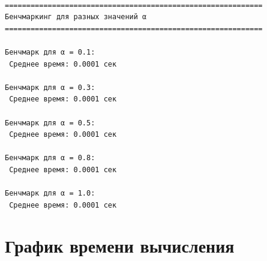 \documentclass[
  russian,
  12pt,
  a4paper,
  DIV=11,
  numbers=noendperiod]{scrreprt}
\newenvironment{Shaded}{\begin{snugshade}}{\end{snugshade}}
\newcommand{\ControlFlowTok}[1]{\textcolor[rgb]{0.00,0.23,0.31}{\textbf{#1}}}
\newcommand{\FloatTok}[1]{\textcolor[rgb]{0.68,0.00,0.00}{#1}}
\newcommand{\FunctionTok}[1]{\textcolor[rgb]{0.28,0.35,0.67}{#1}}
\newcommand{\KeywordTok}[1]{\textcolor[rgb]{0.00,0.23,0.31}{\textbf{#1}}}
\newcommand{\NormalTok}[1]{\textcolor[rgb]{0.00,0.23,0.31}{#1}}
\newcommand{\OperatorTok}[1]{\textcolor[rgb]{0.37,0.37,0.37}{#1}}
\newcommand{\PreprocessorTok}[1]{\textcolor[rgb]{0.68,0.00,0.00}{#1}}
\newcommand{\SpecialCharTok}[1]{\textcolor[rgb]{0.37,0.37,0.37}{#1}}
\newcommand{\StringTok}[1]{\textcolor[rgb]{0.13,0.47,0.30}{#1}}
\begin{document}
\begin{Shaded}
\end{Shaded}

\begin{verbatim}

============================================================
Бенчмаркинг для разных значений α
============================================================

Бенчмарк для α = 0.1:
 Среднее время: 0.0001 сек

Бенчмарк для α = 0.3:
 Среднее время: 0.0001 сек

Бенчмарк для α = 0.5:
 Среднее время: 0.0001 сек

Бенчмарк для α = 0.8:
 Среднее время: 0.0001 сек

Бенчмарк для α = 1.0:
 Среднее время: 0.0001 сек
\end{verbatim}

\section{График времени
вычисления}\label{ux433ux440ux430ux444ux438ux43a-ux432ux440ux435ux43cux435ux43dux438-ux432ux44bux447ux438ux441ux43bux435ux43dux438ux44f}
\end{document}
